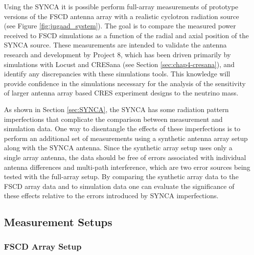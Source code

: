 Using the SYNCA it is possible perform full-array measurements of prototype versions of the FSCD antenna array with a realistic cyclotron radiation source (see Figure \ref{fig:jugaad_system}). The goal is to compare the measured power received to FSCD simulations as a function of the radial and axial position of the SYNCA source. These measurements are intended to validate the antenna research and development by Project 8, which has been driven primarily by simulations with Locust \cite{p8locustpaper} and CRESana (see Section \ref{sec:chap4-cresana}), and identify any discrepancies with these simulations tools. This knowledge will provide confidence in the simulations necessary for the analysis of the sensitivity of larger antenna array based CRES experiment designs to the neutrino mass.

As shown in Section \ref{sec:SYNCA}, the SYNCA has some radiation pattern imperfections that complicate the comparison between measurement and simulation data. One way to disentangle the effects of these imperfections is to perform an additional set of measurements using a synthetic antenna array setup along with the SYNCA antenna. Since the synthetic array setup uses only a single array antenna, the data should be free of errors associated with individual antenna differences and multi-path interference, which are two error sources being tested with the full-array setup. By comparing the synthetic array data to the FSCD array data and to simulation data one can evaluate the significance of these effects relative to the errors introduced by SYNCA imperfections.

\subsection{Measurement Setups}

\subsubsection{FSCD Array Setup}

